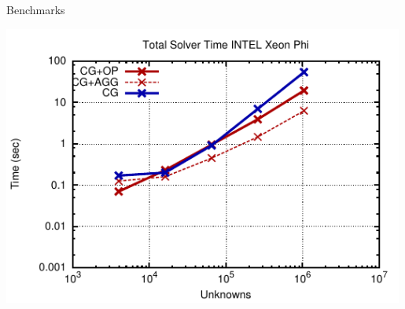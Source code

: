 \begin{frame}{Benchmarks}
  \begin{center}
   \includegraphics[width=0.99\textwidth]{figures/mic-full.pdf}
  \end{center}
\end{frame}


